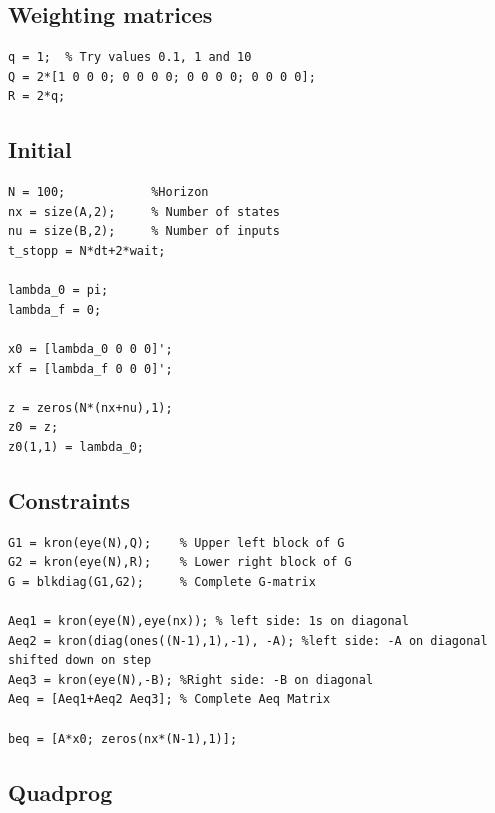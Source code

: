 \documentclass[11pt,a4paper,USenglish]{article} %
\begin{document}
\subsection*{Weighting matrices}

\begin{verbatim}
q = 1;  % Try values 0.1, 1 and 10
Q = 2*[1 0 0 0; 0 0 0 0; 0 0 0 0; 0 0 0 0];
R = 2*q;
\end{verbatim}


\subsection*{Initial}

\begin{verbatim}
N = 100;            %Horizon
nx = size(A,2);     % Number of states
nu = size(B,2);     % Number of inputs
t_stopp = N*dt+2*wait;

lambda_0 = pi;
lambda_f = 0;

x0 = [lambda_0 0 0 0]';
xf = [lambda_f 0 0 0]';

z = zeros(N*(nx+nu),1);
z0 = z;
z0(1,1) = lambda_0;
\end{verbatim}


\subsection*{Constraints}

\begin{verbatim}
G1 = kron(eye(N),Q);    % Upper left block of G
G2 = kron(eye(N),R);    % Lower right block of G
G = blkdiag(G1,G2);     % Complete G-matrix

Aeq1 = kron(eye(N),eye(nx)); % left side: 1s on diagonal
Aeq2 = kron(diag(ones((N-1),1),-1), -A); %left side: -A on diagonal shifted down on step
Aeq3 = kron(eye(N),-B); %Right side: -B on diagonal
Aeq = [Aeq1+Aeq2 Aeq3]; % Complete Aeq Matrix

beq = [A*x0; zeros(nx*(N-1),1)];
\end{verbatim}


\subsection*{Quadprog}
\end{document}
